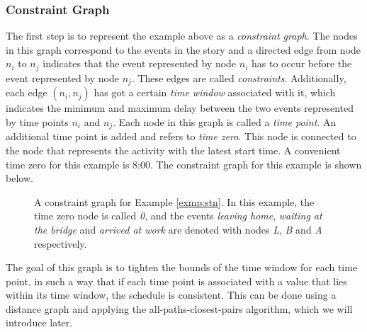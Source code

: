 \documentclass{article}
\theoremstyle{definition}
\begin{document}
\subsubsection{Constraint Graph}
The first step is to represent the example above as a \emph{constraint graph}. 
The nodes in this graph correspond to the events in the story and a directed edge from node $n_i$ to $n_j$ indicates that the event represented by node $n_i$ has to occur before the event represented by node $n_j$.
These edges are called \emph{constraints}. Additionally, each edge $(n_i, n_j)$ has got a certain \emph{time window} associated with it, which indicates the minimum and maximum delay between the two events represented by time points $n_i$ and $n_j$. 
Each node in this graph is called a \emph{time point}. 
An additional time point is added and refers to \emph{time zero}. This node is connected to the node that represents the activity with the latest start time.
A convenient time zero for this example is 8:00.
The constraint graph for this example is shown below. 

\begin{figure}[h]
	\centering
	\caption{A constraint graph for Example \ref{exmp:stn}. In this example, the time zero node is called \emph{0}, and the events \emph{leaving home},  \emph{waiting at the bridge} and \emph{arrived at work} are denoted with nodes \emph{L}, \emph{B} and \emph{A} respectively.}
\end{figure}

The goal of this graph is to tighten the bounds of the time window for each time point, in such a way that if each time point is associated with a value that lies within its time window, the schedule is consistent. 
This can be done using a distance graph and applying the all-paths-closest-pairs algorithm, which we will introduce later.
\end{document}
